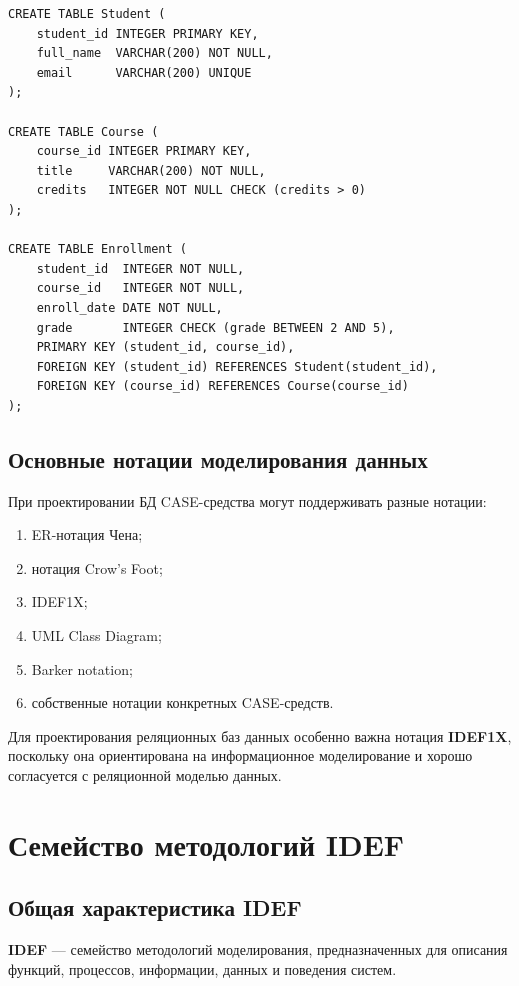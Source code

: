 \documentclass[12pt,a4paper]{article}
\theoremstyle{remark}
\begin{document}
\begin{verbatim}
CREATE TABLE Student (
    student_id INTEGER PRIMARY KEY,
    full_name  VARCHAR(200) NOT NULL,
    email      VARCHAR(200) UNIQUE
);

CREATE TABLE Course (
    course_id INTEGER PRIMARY KEY,
    title     VARCHAR(200) NOT NULL,
    credits   INTEGER NOT NULL CHECK (credits > 0)
);

CREATE TABLE Enrollment (
    student_id  INTEGER NOT NULL,
    course_id   INTEGER NOT NULL,
    enroll_date DATE NOT NULL,
    grade       INTEGER CHECK (grade BETWEEN 2 AND 5),
    PRIMARY KEY (student_id, course_id),
    FOREIGN KEY (student_id) REFERENCES Student(student_id),
    FOREIGN KEY (course_id) REFERENCES Course(course_id)
);
\end{verbatim}

\subsection{Основные нотации моделирования данных}

При проектировании БД CASE-средства могут поддерживать разные нотации:

\begin{enumerate}
    \item ER-нотация Чена;
    \item нотация Crow's Foot;
    \item IDEF1X;
    \item UML Class Diagram;
    \item Barker notation;
    \item собственные нотации конкретных CASE-средств.
\end{enumerate}

Для проектирования реляционных баз данных особенно важна нотация \textbf{IDEF1X}, поскольку она ориентирована на информационное моделирование и хорошо согласуется с реляционной моделью данных.

\section{Семейство методологий IDEF}

\subsection{Общая характеристика IDEF}

\textbf{IDEF} --- семейство методологий моделирования, предназначенных для описания функций, процессов, информации, данных и поведения систем.
\end{document}

